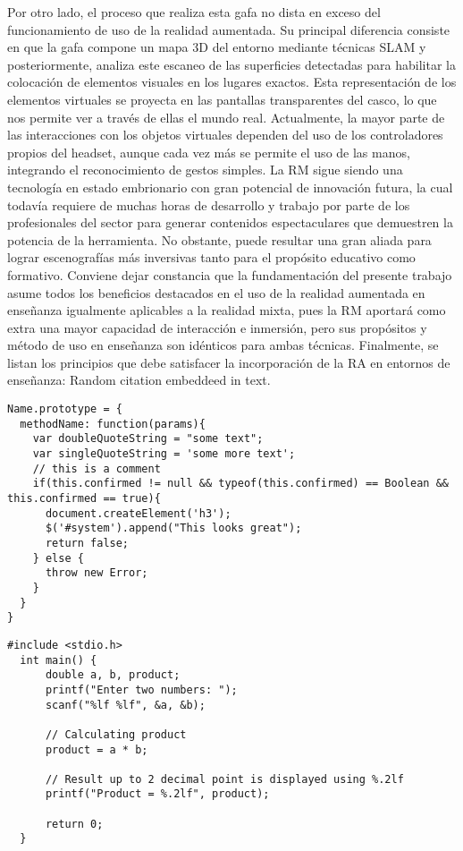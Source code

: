 Por otro lado, el proceso que realiza esta gafa no dista en exceso del funcionamiento de uso de la realidad aumentada. Su principal diferencia consiste en que la gafa compone un mapa 3D del entorno mediante técnicas SLAM y posteriormente, analiza este escaneo de las superficies detectadas para habilitar la colocación de elementos visuales en los lugares exactos. Esta representación de los elementos virtuales se proyecta en las pantallas transparentes del casco, lo que nos permite ver a través de ellas el mundo real. Actualmente, la mayor parte de las interacciones con los objetos virtuales dependen del uso de los controladores propios del headset, aunque cada vez más se permite el uso de las manos, integrando el reconocimiento de gestos simples.
La RM sigue siendo una tecnología en estado embrionario con gran potencial de innovación futura, la cual todavía requiere de muchas horas de desarrollo y trabajo por parte de los profesionales del sector para generar contenidos espectaculares que demuestren la potencia de la herramienta. No obstante, puede resultar una gran aliada para lograr escenografías más inversivas tanto para el propósito educativo como formativo.
Conviene dejar constancia que la fundamentación del presente trabajo asume todos los beneficios destacados en el uso de la realidad aumentada en enseñanza igualmente aplicables a la realidad mixta, pues la RM aportará como extra una mayor capacidad de interacción e inmersión, pero sus propósitos y método de uso en enseñanza son idénticos para ambas técnicas. Finalmente, se listan los principios que debe satisfacer la incorporación de la RA en entornos de enseñanza:
Random citation \autocite[1]{DUMMY1} embeddeed in text.



\begin{lstlisting}[caption=My Javascript Example]
Name.prototype = {
  methodName: function(params){
    var doubleQuoteString = "some text";
    var singleQuoteString = 'some more text';
    // this is a comment
    if(this.confirmed != null && typeof(this.confirmed) == Boolean && this.confirmed == true){
      document.createElement('h3');
      $('#system').append("This looks great");
      return false;
    } else {
      throw new Error;
    }
  }
}
\end{lstlisting}

\begin{lstlisting}[caption=My Javascript Example]
  #include <stdio.h>
  int main() {
      double a, b, product;
      printf("Enter two numbers: ");
      scanf("%lf %lf", &a, &b);  
    
      // Calculating product
      product = a * b;
  
      // Result up to 2 decimal point is displayed using %.2lf
      printf("Product = %.2lf", product);
      
      return 0;
  }
\end{lstlisting}

